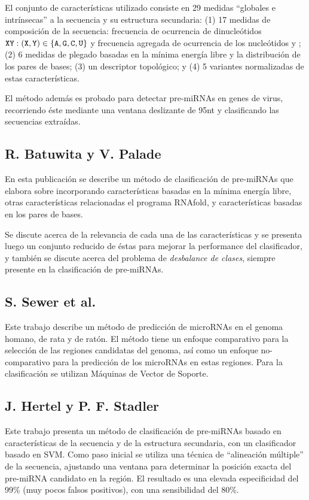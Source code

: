 \documentclass[12pt,bibliography=oldstyle,DIV=12,parskip=half-,titlepage]{scrartcl}
\begin{document}
El conjunto de características utilizado consiste en 29 medidas
``globales e intrínsecas'' a la secuencia y su estructura secundaria:
(1) 17 medidas de composición de la secuencia: frecuencia de
ocurrencia de dinucleótidos
${\tt XY}:({\tt X},{\tt Y})\in\{{\tt A},{\tt G},{\tt C},{\tt U}\}$
y frecuencia agregada de ocurrencia de los nucleótidos  y
; (2) 6 medidas de plegado basadas en la mínima energía libre
y la distribución de los pares de bases; (3) un descriptor
topológico; y (4) 5 variantes normalizadas de estas características.

El método además es probado para detectar pre-miRNAs en genes de
virus, recorriendo éste mediante una ventana deslizante de 95nt y
clasificando las secuencias extraídas.
%
\subsection{R. Batuwita y V. Palade \cite{batuwita}}
En esta publicación se describe un método de clasificación de
pre-miRNAs que elabora sobre \cite{ng} incorporando características
basadas en la mínima energía libre, otras características relacionadas
el programa RNAfold, y características basadas en los pares de bases.

Se discute acerca de la relevancia de cada una de las características
y se presenta luego un conjunto reducido de éstas para mejorar la
performance del clasificador, y también se discute acerca del problema
de \emph{desbalance de clases}, siempre presente en la
clasificación de pre-miRNAs.
%
\subsection{S. Sewer et al. \cite{sewer}}
Este trabajo describe un método de predicción de microRNAs en el
genoma homano, de rata y de ratón. El método tiene un enfoque
comparativo para la selección de las regiones candidatas del genoma,
así como un enfoque no-comparativo para la predicción de los microRNAs
en estas regiones. Para la clasificación se utilizan Máquinas de
Vector de Soporte.
%
\subsection{J. Hertel y P. F. Stadler \cite{hertel}}
Este trabajo presenta un método de clasificación de pre-miRNAs basado
en características de la secuencia y de la estructura secundaria, con
un clasificador basado en SVM. Como paso inicial se utiliza una
técnica de ``alineación múltiple'' de la secuencia, ajustando una
ventana para determinar la posición exacta del pre-miRNA candidato en
la región.  El resultado es una elevada especificidad del 99\% (muy
pocos falsos positivos), con una sensibilidad del 80\%.
%
\end{document}
